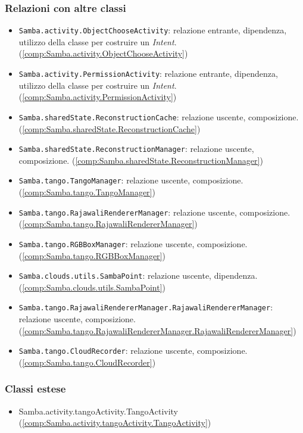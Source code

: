 \subsubsection{Relazioni con altre classi}
\begin{itemize}
	\item \texttt{Samba.activity.ObjectChooseActivity}: relazione entrante, dipendenza, utilizzo della classe per costruire un \emph{Intent}. (\ref{comp:Samba.activity.ObjectChooseActivity})
	\item \texttt{Samba.activity.PermissionActivity}: relazione entrante, dipendenza, utilizzo della classe per costruire un \emph{Intent}. (\ref{comp:Samba.activity.PermissionActivity})
	\item \texttt{Samba.sharedState.ReconstructionCache}: relazione uscente, composizione. (\ref{comp:Samba.sharedState.ReconstructionCache})
	\item \texttt{Samba.sharedState.ReconstructionManager}: relazione uscente, composizione.	 (\ref{comp:Samba.sharedState.ReconstructionManager})
	\item \texttt{Samba.tango.TangoManager}: relazione uscente, composizione. (\ref{comp:Samba.tango.TangoManager})
	\item \texttt{Samba.tango.RajawaliRendererManager}: relazione uscente, composizione. (\ref{comp:Samba.tango.RajawaliRendererManager})
	\item \texttt{Samba.tango.RGBBoxManager}: relazione uscente, composizione. (\ref{comp:Samba.tango.RGBBoxManager})
	\item \texttt{Samba.clouds.utils.SambaPoint}: relazione uscente, dipendenza. (\ref{comp:Samba.clouds.utils.SambaPoint})
	\item \texttt{Samba.tango.RajawaliRendererManager.RajawaliRendererManager}: relazione uscente, composizione. (\ref{comp:Samba.tango.RajawaliRendererManager.RajawaliRendererManager})
	\item \texttt{Samba.tango.CloudRecorder}: relazione uscente, composizione. (\ref{comp:Samba.tango.CloudRecorder})
\end{itemize}
\subsubsection{Classi estese}
\begin{itemize}
	\item Samba.activity.tangoActivity.TangoActivity (\ref{comp:Samba.activity.tangoActivity.TangoActivity})
\end{itemize}


